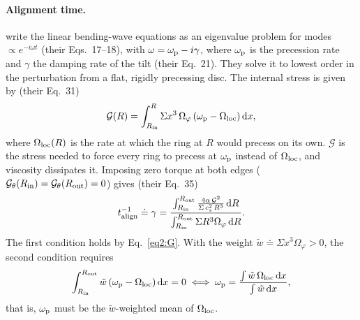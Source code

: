 \paragraph{Alignment time.}
\citet{FoucartLai2014} write the linear bending-wave equations as an eigenvalue problem for modes $\propto e^{-i\omega t}$ (their Eqs.~17--18), with $\omega=\omega_\textup{p}-i\gamma$, where $\omega_\textup{p}$ is the precession rate and $\gamma$ the damping rate of the tilt (their Eq.~21).
They solve it to lowest order in the perturbation from a flat, rigidly precessing disc.
The internal stress is given by (their Eq.~31)
\begin{equation}
    \label{eq2:G}
    \mathcal{G}(R)=\int_{R_\textup{in}}^{R}\Sigma x^3\,\Omega_\varphi\left(\omega_\textup{p}-\Omega_\textup{loc}\right)\textup{d}x ,
\end{equation}
where $\Omega_\textup{loc}(R)$ is the rate at which the ring at $R$ would precess on its own.
$\mathcal{G}$ is the stress needed to force every ring to precess at $\omega_\textup{p}$ instead of $\Omega_\textup{loc}$, and viscosity dissipates it.
Imposing zero torque at both edges ($\mathcal{G}_\theta(R_\textup{in})=\mathcal{G}_\theta(R_\textup{out})=0$) gives (their Eq.~35)
\begin{equation}
    \label{eq2:talign}
    t_\textup{align}^{-1}\doteq\gamma=\frac{\int_{R_\textup{in}}^{R_\textup{out}}\frac{4\alpha\,\mathcal{G}^2}{\Sigma\,c_s^2\,R^3}\,\textup{d}R}{\int_{R_\textup{in}}^{R_\textup{out}}\Sigma R^3\Omega_\varphi\,\textup{d}R}.
\end{equation}
The first condition holds by Eq.~\eqref{eq2:G}.
With the weight $\tilde w\doteq\Sigma x^3\Omega_\varphi>0$, the second condition requires
\begin{equation}
    \label{eq2:BC}
    \int_{R_\textup{in}}^{R_\textup{out}}\tilde w\left(\omega_\textup{p}-\Omega_\textup{loc}\right)\textup{d}x=0
    \iff
    \omega_\textup{p}=\frac{\int\tilde w\,\Omega_\textup{loc}\,\textup{d}x}{\int\tilde w\,\textup{d}x},
\end{equation}
that is, $\omega_\textup{p}$ must be the $\tilde w$-weighted mean of $\Omega_\textup{loc}$.

